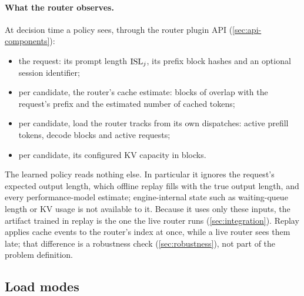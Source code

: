 \paragraph{What the router observes.}
At decision time a policy sees, through the router plugin API (\cref{sec:api-components}):
\begin{itemize}
  \item the request: its prompt length $\mathrm{ISL}_j$, its prefix block hashes and an optional session
    identifier;
  \item per candidate, the router's cache estimate: blocks of overlap with the request's prefix and
    the estimated number of cached tokens;
  \item per candidate, load the router tracks from its own dispatches: active prefill tokens,
    decode blocks and active requests;
  \item per candidate, its configured KV capacity in blocks.
\end{itemize}
The learned policy reads nothing else. In particular it ignores the request's expected output
length, which offline replay fills with the true output length, and every performance-model
estimate; engine-internal state such as waiting-queue length or KV usage is not available to it.
Because it uses only these inputs, the artifact trained in replay is the one the live router runs
(\cref{sec:integration}). Replay applies cache events to the router's index at once, while a live
router sees them late; that difference is a robustness check (\cref{sec:robustness}), not part of
the problem definition.

\subsection{Load modes}
\label{sec:loadmodes}\label{sec:load-modes}

